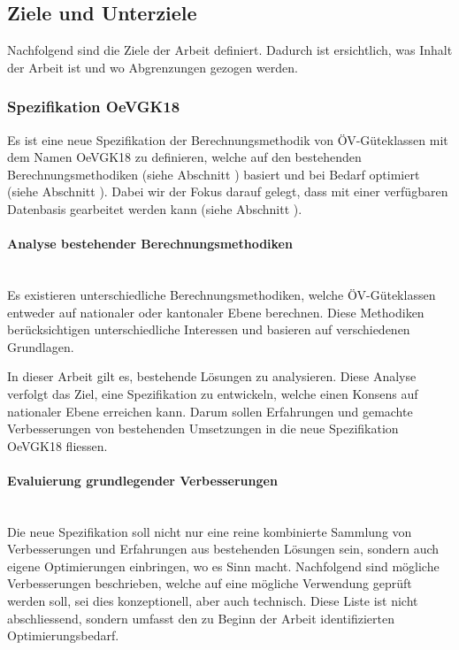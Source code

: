 \subsection{Ziele und Unterziele}
\label{Einführung:Ziele und Unterziele}

Nachfolgend sind die Ziele der Arbeit definiert.
Dadurch ist ersichtlich, was Inhalt der Arbeit ist und wo Abgrenzungen gezogen werden.

\subsubsection{Spezifikation OeVGK18}
\label{Ziele und Unterziele:Spezifikation OeVGK18}

Es ist eine neue Spezifikation der Berechnungsmethodik von \acs{ÖV}-Güteklassen mit dem Namen \gls{OeVGK18} zu definieren, welche auf den bestehenden Berechnungsmethodiken (siehe Abschnitt \emph{}) basiert und bei Bedarf optimiert (siehe Abschnitt \emph{}).
Dabei wir der Fokus darauf gelegt, dass mit einer verfügbaren Datenbasis gearbeitet werden kann (siehe Abschnitt \emph{}).

\paragraph{Analyse bestehender Berechnungsmethodiken}~\\
\label{Spezifikation OeVGK18:Analyse bestehender Berechnungsmethodiken}
Es existieren unterschiedliche Berechnungsmethodiken, welche \acs{ÖV}-Güteklassen entweder auf nationaler oder kantonaler Ebene berechnen.
Diese Methodiken berücksichtigen unterschiedliche Interessen und basieren auf verschiedenen Grundlagen.

In dieser Arbeit gilt es, bestehende Lösungen zu analysieren.
Diese Analyse verfolgt das Ziel, eine Spezifikation zu entwickeln, welche einen Konsens auf nationaler Ebene erreichen kann.
Darum sollen Erfahrungen und gemachte Verbesserungen von bestehenden Umsetzungen in die neue Spezifikation \gls{OeVGK18} fliessen.

\paragraph{Evaluierung grundlegender Verbesserungen}~\\
\label{Spezifikation OeVGK18:Evaluierung grundlegender Verbesserungen}
Die neue Spezifikation soll nicht nur eine reine kombinierte Sammlung von Verbesserungen und Erfahrungen aus bestehenden Lösungen sein, sondern auch eigene Optimierungen einbringen, wo es Sinn macht.
Nachfolgend sind mögliche Verbesserungen beschrieben, welche auf eine mögliche Verwendung geprüft werden soll, sei dies konzeptionell, aber auch technisch.
Diese Liste ist nicht abschliessend, sondern umfasst den zu Beginn der Arbeit identifizierten Optimierungsbedarf.

